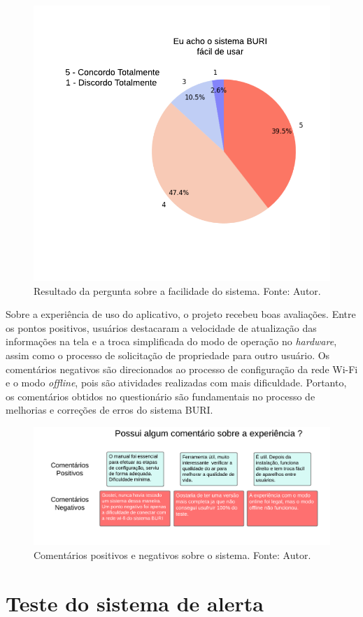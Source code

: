 \begin{figure}[ht]
    \centering
    \includegraphics[width=.44\textwidth]{img/questionario/1/graf-sistema-buri-facil-de-usar.png}
    \caption{Resultado da pergunta sobre a facilidade do sistema. Fonte: Autor.}\label{grafBuriFacilDeUsar}
\end{figure}

Sobre a experiência de uso do aplicativo, o projeto recebeu boas avaliações. Entre os pontos positivos, 
usuários destacaram a velocidade de atualização das informações na tela e a troca simplificada do modo de operação no \textit{hardware}, assim como o processo de solicitação de propriedade 
para outro usuário. Os comentários negativos são direcionados ao processo de configuração da rede Wi-Fi e o modo \textit{offline}, pois são atividades 
realizadas com mais dificuldade. Portanto, os comentários obtidos no questionário são fundamentais no processo de melhorias e correções de erros do sistema BURI.


\begin{figure}[ht]
    \centering
    \includegraphics[width=.84\textwidth]{img/questionario/1/relato-comentarios-sistema-buri.png}
    \caption{Comentários positivos e negativos sobre o sistema. Fonte: Autor.}\label{grafComentarios}
\end{figure}

\section{Teste do sistema de alerta}\label{alerta}

